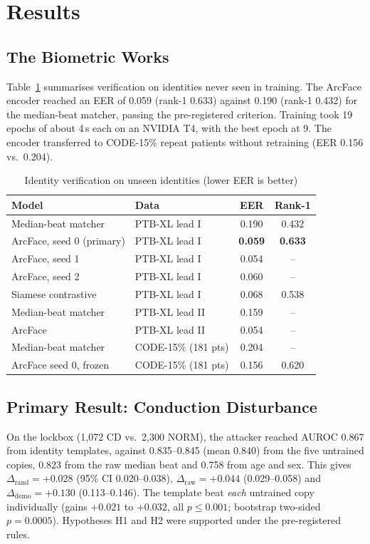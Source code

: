 \documentclass[journal]{IEEEtran}
\newcommand{\drand}{\Delta_{\mathrm{rand}}}
\newcommand{\dsig}{\Delta_{\mathrm{raw}}}
\newcommand{\ddemo}{\Delta_{\mathrm{demo}}}
\begin{document}
\section{Results}\label{sec:results}
\subsection{The Biometric Works}
Table~\ref{tab:identity} summarises verification on identities never seen in training. The ArcFace encoder reached an EER of 0.059 (rank-1 0.633) against 0.190 (rank-1 0.432) for the median-beat matcher, passing the pre-registered criterion. Training took 19 epochs of about 4\,s each on an NVIDIA T4, with the best epoch at 9. The encoder transferred to CODE-15\% repeat patients without retraining (EER 0.156 vs.\ 0.204).

\begin{table}[!t]
\centering
\caption{Identity verification on unseen identities (lower EER is better)}
\label{tab:identity}
\begin{tabular}{@{}llcc@{}}
\toprule
Model & Data & EER & Rank-1 \\
\midrule
Median-beat matcher & PTB-XL lead I & 0.190 & 0.432 \\
ArcFace, seed 0 (primary) & PTB-XL lead I & \textbf{0.059} & \textbf{0.633} \\
ArcFace, seed 1 & PTB-XL lead I & 0.054 & -- \\
ArcFace, seed 2 & PTB-XL lead I & 0.060 & -- \\
Siamese contrastive & PTB-XL lead I & 0.068 & 0.538 \\
Median-beat matcher & PTB-XL lead II & 0.159 & -- \\
ArcFace & PTB-XL lead II & 0.054 & -- \\
Median-beat matcher & CODE-15\% (181 pts) & 0.204 & -- \\
ArcFace seed 0, frozen & CODE-15\% (181 pts) & 0.156 & 0.620 \\
\bottomrule
\end{tabular}
\end{table}

\subsection{Primary Result: Conduction Disturbance}
On the lockbox (1{,}072 CD vs.\ 2{,}300 NORM), the attacker reached AUROC 0.867 from identity templates, against 0.835--0.845 (mean 0.840) from the five untrained copies, 0.823 from the raw median beat and 0.758 from age and sex. This gives $\drand=+0.028$ (95\% CI 0.020--0.038), $\dsig=+0.044$ (0.029--0.058) and $\ddemo=+0.130$ (0.113--0.146). The template beat \emph{each} untrained copy individually (gains $+0.021$ to $+0.032$, all $p\le0.001$; bootstrap two-sided $p=0.0005$). Hypotheses H1 and H2 were supported under the pre-registered rules.
\end{document}
